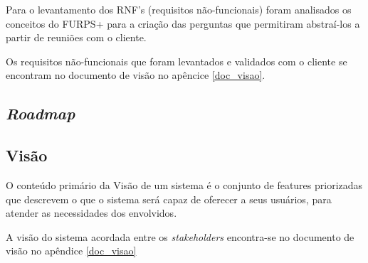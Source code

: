 	  Para o levantamento dos RNF's (requisitos não-funcionais) foram analisados os conceitos do FURPS+ para a criação das perguntas que permitiram abstraí-los 
	  a partir de reuniões com o cliente.
	  
	  Os requisitos não-funcionais que foram levantados e validados com o cliente se encontram no
	  documento de visão no apêncice \ref{doc_visao}.	
      
    \subsection{\textit{Roadmap}}
    
      
    
    \subsection{Visão}
    
      O conteúdo primário da Visão de um sistema é o conjunto de features priorizadas que descrevem o que o sistema será capaz de oferecer 
      a seus usuários, para atender as necessidades dos envolvidos. \cite{leffingwell11}
      
      A visão do sistema acordada entre os \textit{stakeholders} encontra-se no documento de visão no apêndice \ref{doc_visao}
      
      \vfill